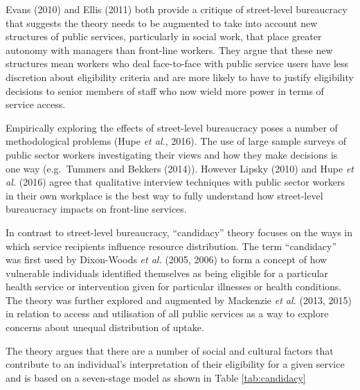 \documentclass[12pt,a4paper,oneside,table]{report}
\begin{document}
Evans (2010) and Ellis (2011) both provide a critique of street-level
bureaucracy that suggests the theory needs to be augmented to take into
account new structures of public services, particularly in social work,
that place greater autonomy with managers than front-line workers. They
argue that these new structures mean workers who deal face-to-face with
public service users have less discretion about eligibility criteria and
are more likely to have to justify eligibility decisions to senior
members of staff who now wield more power in terms of service access.

Empirically exploring the effects of street-level bureaucracy poses a
number of methodological problems (Hupe \emph{et al.}, 2016). The use of
large sample surveys of public sector workers investigating their views
and how they make decisions is one way (e.g.~Tummers and Bekkers
(2014)). However Lipsky (2010) and Hupe \textit{et al.} (2016) agree
that qualitative interview techniques with public sector workers in
their own workplace is the best way to fully understand how street-level
bureaucracy impacts on front-line services.

In contrast to street-level bureaucracy, ``candidacy'' theory focuses on
the ways in which service recipients influence resource distribution.
The term ``candidacy'' was first used by Dixon-Woods \textit{et al.}
(2005, 2006) to form a concept of how vulnerable individuals identified
themselves as being eligible for a particular health service or
intervention given for particular illnesses or health conditions. The
theory was further explored and augmented by Mackenzie \textit{et al.}
(2013, 2015) in relation to access and utilisation of all public
services as a way to explore concerns about unequal distribution of
uptake.

The theory argues that there are a number of social and cultural factors
that contribute to an individual's interpretation of their eligibility
for a given service and is based on a seven-stage model as shown in
Table \ref{tab:candidacy}
\end{document}
